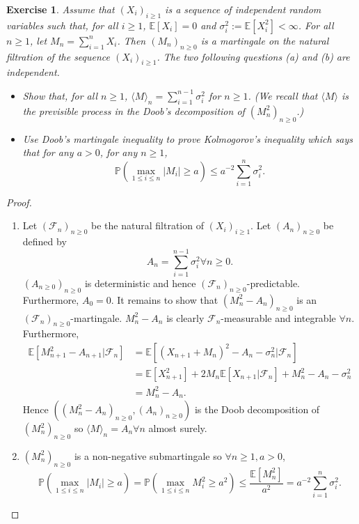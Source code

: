 \documentclass{article}
\newtheorem{exercise}[theorem]{Exercise}
\begin{document}
\begin{exercise}
Assume that $(X_i)_{i \geq 1}$ is a sequence of independent random variables such that, for all $i \geq 1$, $\mathbb{E}[X_i] = 0$ and $\sigma_i^2 := \mathbb{E}[X_i^2] < \infty$. For all $n \geq 1$, let $M_n = \sum_{i=1}^n X_i$. Then $(M_n)_{n \geq 0}$ is a martingale on the natural filtration of the sequence $(X_i)_{i \geq 1}$. The two following questions (a) and (b) are independent.

\begin{itemize}
    \item[(a)] Show that, for all $n \geq 1$, $\langle M \rangle_n = \sum_{i=1}^{n-1} \sigma_i^2$ for $n \geq 1$. (We recall that $\langle M \rangle$ is the previsible process in the Doob’s decomposition of $(M_n^2)_{n \geq 0}$.)
    
    \item[(b)] Use Doob’s martingale inequality to prove \textit{Kolmogorov’s inequality} which says that for any $a > 0$, for any $n \geq 1$,
    \[
    \mathbb{P} \left( \max_{1 \leq i \leq n} |M_i| \geq a \right) \leq a^{-2} \sum_{i=1}^n \sigma_i^2.
    \]
\end{itemize}
\end{exercise}
\begin{proof}
\begin{enumerate}
\item[(a)] Let $(\mathcal{F}_n)_{n\geq0}$ be the natural filtration of $(X_i)_{i\geq 1}$. Let $(A_n)_{n\geq0}$ be defined by \[A_n=\sum_{i=1}^{n-1}\sigma_i^2\forall n\geq0.\]$(A_{n\geq0})_{n\geq0}$ is deterministic and hence $(\mathcal{F}_n)_{n\geq0}$-predictable. Furthermore, $A_0=0$. It remains to show that $(M_n^2-A_n)_{n\geq0}$ is an $(\mathcal{F}_n)_{n\geq0}$-martingale. $M_n^2-A_n$ is clearly $\mathcal{F}_n$-measurable and integrable $\forall n$. Furthermore,\begin{align*}
\mathbb{E}[M_{n+1}^2-A_{n+1}|\mathcal{F}_n]&=\mathbb{E}\left[\left(X_{n+1}+M_n\right)^2-A_n-\sigma_n^2|\mathcal{F}_n\right]\\&=\mathbb{E}[X_{n+1}^2]+2M_n\mathbb{E}[X_{n+1}|\mathcal{F}_n]+M_n^2-A_n-\sigma_n^2\\&=M_n^2-A_n.
\end{align*}Hence $((M_n^2-A_n)_{n\geq0},(A_n)_{n\geq0})$ is the Doob decomposition of $(M_n^2)_{n\geq 0}$ so $\langle M\rangle_n=A_n\forall n$ almost surely.
\item[(b)] $(M_n^2)_{n\geq0}$ is a non-negative submartingale so $\forall n\geq1,a>0$,\[\mathbb{P}(\max_{1\leq i\leq n}|M_i|\geq a)=\mathbb{P}(\max_{1\leq i\leq n}M_i^2\geq a^2)\leq\frac{\mathbb{E}[M_n^2]}{a^2}=a^{-2}\sum_{i=1}^n\sigma_i^2.\]
\end{enumerate}
\end{proof}
\end{document}
